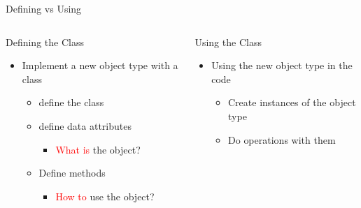 \documentclass[pdf, aspectratio=169, 12pt]{beamer}
\begin{document}
\begin{frame}{Defining vs Using}
	\begin{columns}[t]
		\begin{block}{Defining the Class}
			\begin{itemize}
				\item \alert{Implement} a new object type with a class
					\begin{itemize}
						\item define the class
						\item define \alert{data attributes}
							\begin{itemize}
								\item \textcolor{Red}{What is} the object?
							\end{itemize}
						\item Define \alert{methods}
							\begin{itemize}
								\item \textcolor{Red}{How to} use the object?
							\end{itemize}
					\end{itemize}
			\end{itemize}
		\end{block}
		\begin{block}{Using the Class}
			\begin{itemize}
				\item \alert{Using} the new object type in the code
					\begin{itemize}
						\item Create \alert{instances} of the object type
						\item Do \alert{operations} with them
					\end{itemize}
			\end{itemize}
		\end{block}
		
	\end{columns}
\end{frame}
\end{document}
